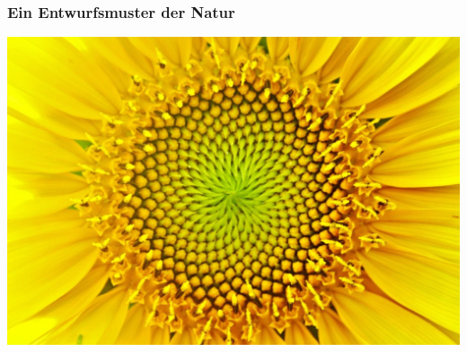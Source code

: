 \documentclass[12pt,compress,english,utf8,t]{beamer}
\begin{document}
\begin{frame}\frametitle{Ein Entwurfsmuster der Natur}
  \begin{center}
    \includegraphics[height=0.6\textheight]{sonnenblume2}
    \bigskip


\end{center}
\end{frame}
\end{document}
